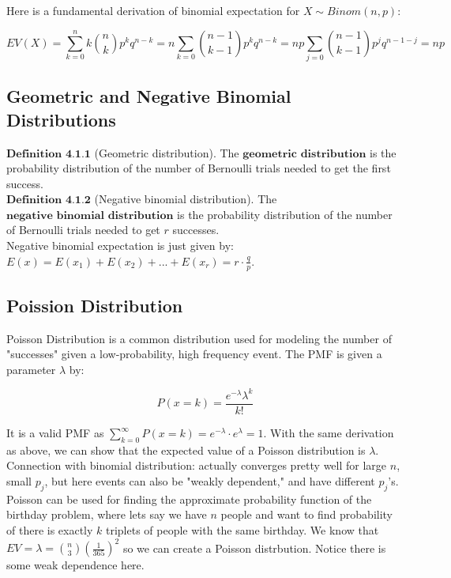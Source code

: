 \documentclass{article}
\begin{document}
    Here is a fundamental derivation of binomial expectation for $X \sim Binom(n,p)$:

    $$EV(X) = \sum_{k=0}^n k{n\choose k}p^kq^{n-k} = n\sum_{k=0} {n-1 \choose k-1}p^kq^{n-k} = np\sum_{j=0} {n-1 \choose k-1}p^{j}q^{n-1-j}=np$$

    \subsection*{Geometric and Negative Binomial Distributions}

    $\textbf{Definition 4.1.1}$ (Geometric distribution). The $\textbf{geometric distribution}$ is the probability distribution of the number of Bernoulli trials needed to get the first success.\\

    $\textbf{Definition 4.1.2}$ (Negative binomial distribution). The $\textbf{negative binomial distribution}$ is the probability distribution of the number of Bernoulli trials needed to get $r$ successes.\\
    
    Negative binomial expectation is just given by: $E(x) = E(x_1) + E(x_2) + ... + E(x_r) = r\cdot \frac{q}{p}$.\\

    \subsection*{Poission Distribution}

    Poisson Distribution is a common distribution used for modeling the number of "successes" given a low-probability, high frequency event. The PMF is given a parameter $\lambda$ by:

    $$P(x=k) = \frac{e^{-\lambda}\lambda^k}{k!}$$

    It is a valid PMF as $\sum_{k=0}^{\infty}P(x=k)=e^{-\lambda}\cdot e^\lambda=1$. With the same derivation as above, we can show that the expected value of a Poisson distribution is $\lambda$.\\

    Connection with binomial distribution: actually converges pretty well for large $n$, small $p_j$, but here events can also be "weakly dependent," and have different $p_j$'s.\\

    Poisson can be used for finding the approximate probability function of the birthday problem, where lets say  we have $n$ people and want to find probability of there is exactly $k$ triplets of people with the same birthday. We know that $EV=\lambda={n\choose 3}(\frac{1}{365})^2$ so we can create a Poisson distrbution. Notice there is some weak dependence here.\\
\end{document}
